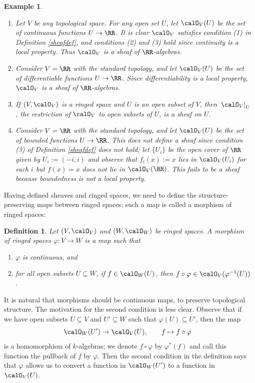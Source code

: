 \documentclass[12pt]{amsart}
\theoremstyle{plain}
\newtheorem{definition}[theorem]{Definition}
\newtheorem{example}[theorem]{Example}
\begin{document}
\begin{example}
\begin{enumerate}
\item Let $V$ be any topological space.
For any open set $U$, let $\calO_V(U)$ be the set of continuous functions $U \to \RR$.
It is clear $\calO_V$ satisfies condition (1) in Definition \ref{sheafdef}, and conditions (2) and (3) hold since continuity is a local property. Thus $\calO_V$ is a sheaf of $\RR$-algebras.
\item Consider $V = \RR$ with the standard topology, and let $\calO_V(U)$ be the set of differentiable functions $U \to \RR$.
Since differentiability is a local property, $\calO_V$ is a sheaf of $\RR$-algebras.
\item If $(V, \calO_V)$ is a ringed space and $U$ is an open subset of $V$, then $\left. \calO_V \right|_U$, the restriction of $\calO_V$ to open subsets of $U$, is a sheaf on $U$.
\item Consider $V = \RR$ with the standard topology, and let $\calO_V(U)$ be the set of bounded functions $U \to \RR$.
This does not define a sheaf since condition (3) of Definition \ref{sheafdef} does not hold;
let $\{U_i\}$ be the open cover of $\RR$ given by $U_i:=(-i, i)$ and observe that $f_i(x):=x$ lies in $\calO_V(U_i)$ for each $i$ but $f(x) = x$ does not lie in $\calO_V(\RR)$.
This fails to be a sheaf because boundedness is not a local property.
\end{enumerate}
\end{example}

Having defined sheaves and ringed spaces, we need to define the structure-preserving maps between ringed spaces;
such a map is called a morphism of ringed spaces:

\begin{definition}\label{definition:morphismringedspace}
Let $(V, \calO_V)$ and $(W, \calO_W)$ be ringed spaces.
A morphism of ringed spaces $\varphi : V \to W$ is a map such that
\begin{enumerate}
\item 
$\varphi$ is continuous, and
\item
for all open subsets $U \subseteq W$, if $f \in \calO_W(U)$, then $f\circ\varphi \in \calO_V(\varphi^{-1}(U))$.
\end{enumerate}
\end{definition}

It is natural that morphisms should be continuous maps, to preserve topological structure.
The motivation for the second condition is less clear.
Observe that if we have open subsets $U \subseteq V$ and $U' \subseteq W$ such that $\varphi(U)\subseteq U'$, then the map
$$\calO_W(U') \to \calO_V(U), \qquad f \mapsto f\circ\varphi$$
is a homomorphism of $k$-algebras;
we denote $f \circ \varphi$ by $\varphi^*(f)$ and call this function the pullback of $f$ by $\varphi$.
Then the second condition in the definition says that $\varphi$ allows us to convert a function in $\calO_W(U')$ to a function in $\calO_V(U)$.
\end{document}
